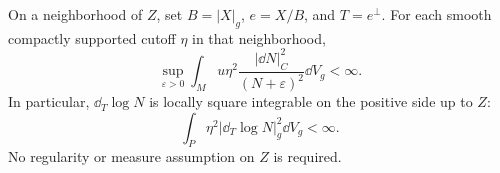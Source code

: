 \begin{lemma}
\label{geo-logarithmic-energy}
On a neighborhood of $Z$, set $B=|X|_g$, $e=X/B$, and $T=e^\perp$.
For each smooth compactly supported cutoff $\eta$ in that neighborhood,
\begin{equation}
 \sup_{\varepsilon>0}
 \int_M u\eta^2\frac{|\dd N|_C^2}{(N+\varepsilon)^2}\dd V_g<\infty.
 \label{geo-log-energy-bound}
\end{equation}
In particular, $\dd_T\log N$ is locally square integrable on the positive
side up to $Z$:
\begin{equation}
 \int_P\eta^2|\dd_T\log N|_g^2\dd V_g<\infty.
 \label{geo-log-transverse}
\end{equation}
No regularity or measure assumption on $Z$ is required.
\end{lemma}
